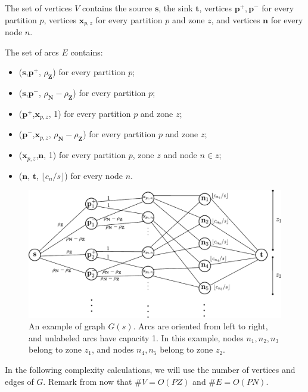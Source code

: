 \documentclass[]{article}
\begin{document}
The set of vertices $V$ contains the source $\mathbf{s}$, the sink $\mathbf{t}$, vertices 
$\mathbf{p^+, p^-}$ for every partition $p$, vertices $\mathbf{x}_{p,z}$ for every partition $p$ and zone $z$, and vertices $\mathbf{n}$ for every node $n$. 

The set of arcs $E$ contains:
\begin{itemize}
	\item ($\mathbf{s}$,$\mathbf{p}^+$, $\rho_\mathbf{Z}$) for every partition $p$;
	\item ($\mathbf{s}$,$\mathbf{p}^-$, $\rho_\mathbf{N}-\rho_\mathbf{Z}$) for every partition $p$;
	\item ($\mathbf{p}^+$,$\mathbf{x}_{p,z}$, 1) for every partition $p$ and zone $z$;
	\item ($\mathbf{p}^-$,$\mathbf{x}_{p,z}$, $\rho_\mathbf{N}-\rho_\mathbf{Z}$) for every partition $p$ and zone $z$;
	\item ($\mathbf{x}_{p,z}$,$\mathbf{n}$, 1) for every partition $p$, zone $z$ and node $n\in z$;
	\item ($\mathbf{n}$, $\mathbf{t}$, $\lfloor c_n/s \rfloor$) for every node $n$.
\end{itemize}

\begin{figure}
	\centering
	\includegraphics[width=\linewidth]{figures/flow_graph_param}
	\caption{An example of graph $G(s)$. Arcs are oriented from left to right, and unlabeled arcs have capacity 1. In this example, nodes $n_1,n_2,n_3$ belong to zone $z_1$, and nodes $n_4,n_5$ belong to zone $z_2$.}
	\label{fig:flowgraph}
\end{figure}

In the following complexity calculations, we will use the number of vertices and edges of $G$. Remark from now that $\# V = O(PZ)$ and $\# E = O(PN)$.
\end{document}
